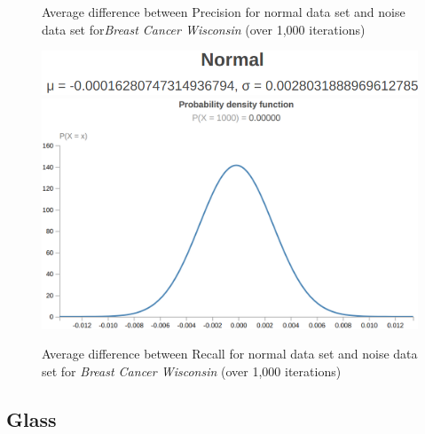 \documentclass[twoside,11pt]{article}
\begin{document}
\begin{figure}[!hbp]
\begin{minipage}[b]{0.3\textwidth}
        \caption{Average difference between Precision for normal data set and noise data set for\emph{Breast Cancer Wisconsin} (over 1,000 iterations)}
    \end{minipage}
    \hfill
    \begin{minipage}[b]{0.3\textwidth}
        \includegraphics[width=\textwidth]{bs-r-ms.png}
        \includegraphics[width=\textwidth]{bs-r-ds.png}
        \caption{Average difference between Recall for normal data set and noise data set for \emph{Breast Cancer Wisconsin} (over 1,000 iterations)}
    \end{minipage}
\end{figure}

\subsection{Glass}
\end{document}

